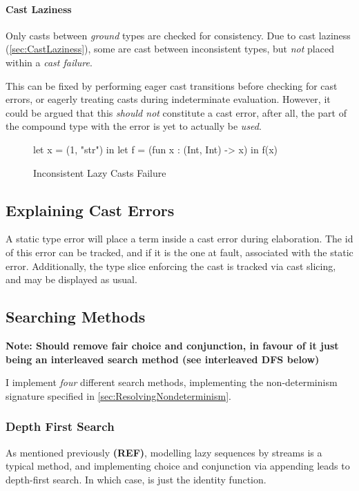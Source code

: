 \paragraph{Cast Laziness}
\label{sec:SearchCastLaziness}
Only casts between \textit{ground} types are checked for consistency. Due to cast laziness (\cref{sec:CastLaziness}), some are cast between inconsistent types, but \textit{not} placed within a \textit{cast failure}.

This can be fixed by performing eager cast transitions before checking for cast errors, or eagerly treating casts during indeterminate evaluation. However, it could be argued that this \textit{should not} constitute a cast error, after all, the part of the compound type with the error is yet to actually be \textit{used}.
\begin{figure}
let x = (1, "str") in 
let f = (fun x : (Int, Int) -> x) 
in f(x)
\caption{Inconsistent Lazy Casts Failure}
\end{figure}

\subsection{Explaining Cast Errors}
\label{sec:StaticCastError}
A static type error will place a term inside a cast error during elaboration. The id of this error can be tracked, and if it is the one at fault, associated with the static error. Additionally, the type slice enforcing the cast is tracked via cast slicing, and may be displayed as usual.

\subsection{Searching Methods}\label{sec:SearchMethods}
\textbf{Note: Should remove fair choice and conjunction, in favour of it just being an interleaved search method (see interleaved DFS below)}

I implement \textit{four} different search methods, implementing the non-determinism signature specified in \cref{sec:ResolvingNondeterminism}.

\subsubsection{Depth First Search}
As mentioned previously \textbf{(REF)}, modelling lazy sequences by streams is a typical method, and implementing choice and conjunction via appending leads to depth-first search. In which case,  is just the identity function.

